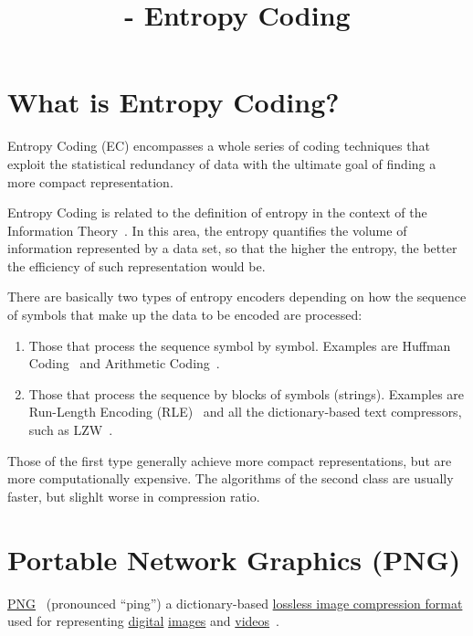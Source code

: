 


\title{\SM{} - Entropy Coding}

\maketitle

\tableofcontents

\section{What is Entropy Coding?}

Entropy Coding (EC) encompasses a whole series of coding techniques
that exploit the statistical redundancy of data with the ultimate goal
of finding a more compact representation.

Entropy Coding is related to the definition of entropy in the context
of the Information Theory~\cite{vruiz__information_theory}. In this
area, the entropy quantifies the volume of information represented by
a data set, so that the higher the entropy, the better the efficiency
of such representation would be.

There are basically two types of entropy encoders depending on how the
sequence of symbols that make up the data to be encoded are processed:

\begin{enumerate}
\item Those that process the sequence symbol by symbol. Examples are
  Huffman Coding~\cite{vruiz__huffman_coding} and Arithmetic
  Coding~\cite{vruiz__arithmetic_coding}.
\item Those that process the sequence by blocks of symbols
  (strings). Examples are Run-Length Encoding (RLE)~\cite{vruiz__rle} and all the
  dictionary-based text compressors, such as LZW~\cite{vruiz__LZW}.
\end{enumerate}
  
Those of the first type generally achieve more compact
representations, but are more computationally expensive. The
algorithms of the second class are usually faster, but slighlt worse
in compression ratio.

\section{Portable Network Graphics (PNG)}

\href{https://en.wikipedia.org/wiki/Portable_Network_Graphics}{PNG}~\cite{vruiz__PNG}
(pronounced ``ping'') a dictionary-based
\href{https://en.wikipedia.org/wiki/Lossless_compression}{lossless
  image compression format} used for representing
\href{https://en.wikipedia.org/wiki/Digital_data}{digital}
\href{https://en.wikipedia.org/wiki/Digital_image}{images} and
\href{https://en.wikipedia.org/wiki/Video}{videos}~\cite{vruiz__image_video}.

